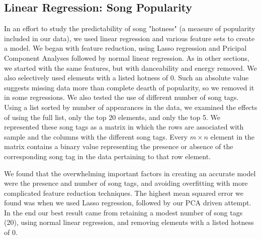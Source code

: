 \documentclass[12pt]{article}
\begin{document}
\subsection{Linear Regression: Song Popularity}
\label{subsec:linearRegression}
In an effort to study the predictability of song "hotness" (a measure of popularity included in our data), we used linear regression and various feature sets to create a model. We began with feature reduction, using Lasso regression and Pricipal Component Analyses followed by normal linear regression. As in other sections, we started with the same features, but with danceability and energy removed. We also selectively used elements with a listed hotness of 0. Such an absolute value suggests missing data more than complete dearth of popularity, so we removed it in some regressions. We also tested the use of different number of song tags. Using a list sorted by number of appearances in the data, we examined the effects of using the full list, only the top 20 elements, and only the top 5. We represented these song tags as a matrix in which the rows are associated with sample and the columns with the different song tags. Every $m \times n$ element in the matrix contains a binary value representing the presence or absence of the corresponding song tag in the data pertaining to that row element.

We found that the overwhelming important factors in creating an accurate model were the presence and number of song tags, and avoiding overfitting with more complicated feature reduction techniques. The highest mean squared error we found was when we used Lasso regression, followed by our PCA driven attempt. In the end our best result came from retaining a modest number of song tags (20), using normal linear regression, and removing elements with a listed hotness of 0.

\end{document}
